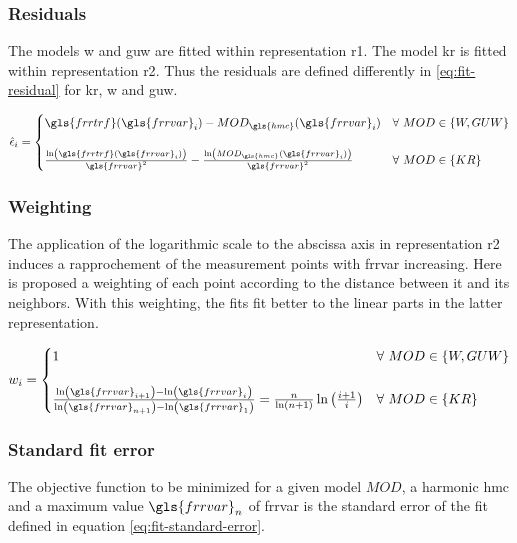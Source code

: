 \subsubsection{Residuals}

The models \gls{w}  and \gls{guw} are fitted within representation \gls{r1}.
The model \gls{kr} is fitted within representation \gls{r2}.
Thus the residuals are defined differently in \eqref{eq:fit-residual} for \gls{kr}, \gls{w} and \gls{guw}.

\begin{equation}
\hat{\epsilon}_i =
\begin{cases}
\gls{frrtrf}(\gls{frrvar}_i) - MOD_{\gls{hmc}}(\gls{frrvar}_i) & \forall \ MOD \in \{ W, GUW \} \\[5mm]
\frac{\ln\left(\gls{frrtrf}(\gls{frrvar}_i)\right)}{\gls{frrvar}^2} -
\frac{\ln\left(MOD_{\gls{hmc}}(\gls{frrvar}_i)\right)}{\gls{frrvar}^2} & \forall \ MOD \in \{ KR \}
\end{cases}
 \label{eq:fit-residual}
\end{equation}

\subsubsection{Weighting}
The application of the logarithmic scale to the abscissa axis in representation \gls{r2} induces a rapprochement of the measurement points with \gls{frrvar} increasing.
Here is proposed a weighting of each point according to the distance between it and its neighbors.
With this weighting, the fits fit better to the linear parts in the latter representation.

\begin{equation}
w_i =
\begin{cases}
1
& \forall \ MOD \in \{ W, GUW \}
\\[5mm]
\frac{
\ln \left(\gls{frrvar}_{i + 1} \right) - \ln \left(\gls{frrvar}_i\right)
}{
\ln \left(\gls{frrvar}_{n + 1} \right) - \ln \left(\gls{frrvar}_1\right)
} =
\frac{n}{\ln \left( n + 1 \right)} \ln \left( \frac{i+1}{i} \right)
& \forall \ MOD \in \{ KR \}
\end{cases}
\end{equation}

\subsubsection{Standard fit error}
The objective function to be minimized for a given model \( MOD \), a harmonic \gls{hmc} and a maximum value \( \gls{frrvar}_n \) of \gls{frrvar} is the standard error of the fit defined in equation \eqref{eq:fit-standard-error}.

